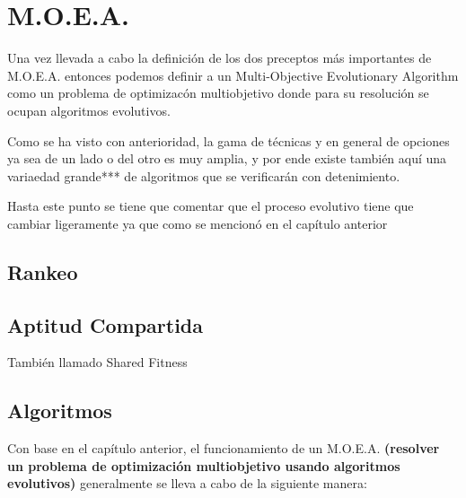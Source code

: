 \documentclass[class=report, crop=false]{standalone}
\begin{document}
\chapter {M.O.E.A.}


Una vez llevada a cabo la definición de los dos preceptos más importantes
de M.O.E.A. entonces podemos definir a un Multi-Objective Evolutionary 
Algorithm como un problema de optimizacón multiobjetivo donde para su
resolución se ocupan algoritmos evolutivos.

Como se ha visto con anterioridad, la gama de técnicas y en general de opciones
ya sea de un lado o del otro es muy amplia, y por ende existe también aquí
una variaedad grande*** de algoritmos que se verificarán con detenimiento.

Hasta este punto se tiene que comentar que el proceso evolutivo tiene que cambiar
ligeramente ya que como se mencionó en el capítulo anterior 



\section{Rankeo}

\section{Aptitud Compartida}  
También llamado Shared Fitness

\section{Algoritmos}
Con base en el capítulo anterior, el funcionamiento de un M.O.E.A. 
\textbf{(resolver un problema de optimización multiobjetivo usando 
algoritmos evolutivos)} generalmente se lleva a cabo de la siguiente 
manera:
\end{document}
